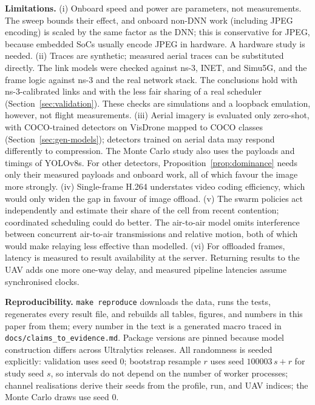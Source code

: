 \documentclass[journal,twocolumn,10pt]{IEEEtran}
\begin{document}
\textbf{Limitations.} (i) Onboard speed and power are parameters, not measurements. The sweep bounds their effect, and onboard non-DNN work (including JPEG encoding) is scaled by the same factor as the DNN; this is conservative for JPEG, because embedded SoCs usually encode JPEG in hardware. A hardware study is needed. (ii) Traces are synthetic; measured aerial traces can be substituted directly. The link models were checked against ns-3, INET, and Simu5G, and the frame logic against ns-3 and the real network stack. The conclusions hold with ns-3-calibrated links and with the less fair sharing of a real scheduler (Section~\ref{sec:validation}). These checks are simulations and a loopback emulation, however, not flight measurements. (iii) Aerial imagery is evaluated only zero-shot, with COCO-trained detectors on VisDrone mapped to COCO classes (Section~\ref{sec:gen-models}); detectors trained on aerial data may respond differently to compression. The Monte Carlo study also uses the payloads and timings of YOLOv8s. For other detectors, Proposition~\ref{prop:dominance} needs only their measured payloads and onboard work, all of which favour the image more strongly. (iv) Single-frame H.264 understates video coding efficiency, which would only widen the gap in favour of image offload. (v) The swarm policies act independently and estimate their share of the cell from recent contention; coordinated scheduling could do better. The air-to-air model omits interference between concurrent air-to-air transmissions and relative motion, both of which would make relaying less effective than modelled. (vi) For offloaded frames, latency is measured to result availability at the server. Returning results to the UAV adds one more one-way delay, and measured pipeline latencies assume synchronised clocks.

\textbf{Reproducibility.} \texttt{make reproduce} downloads the data, runs the tests, regenerates every result file, and rebuilds all tables, figures, and numbers in this paper from them; every number in the text is a generated macro traced in \texttt{docs/claims\_to\_evidence.md}. Package versions are pinned because model construction differs across Ultralytics releases. All randomness is seeded explicitly: validation uses seed 0; bootstrap resample $r$ uses seed $100003\,s+r$ for study seed $s$, so intervals do not depend on the number of worker processes; channel realisations derive their seeds from the profile, run, and UAV indices; the Monte Carlo draws use seed 0.
\end{document}
